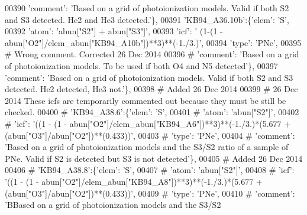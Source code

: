 \begin{DoxyCode}
00390                                       \textcolor{stringliteral}{'comment'}: \textcolor{stringliteral}{'Based on a grid of photoionization models. Valid if both
       S2 and S3 detected. He2 and He3 detected.'}\},
00391                          \textcolor{stringliteral}{'KB94\_A36.10b'}:\{\textcolor{stringliteral}{'elem'}: \textcolor{stringliteral}{'S'},
00392                                      \textcolor{stringliteral}{'atom'}: \textcolor{stringliteral}{'abun["S2"] + abun["S3"]'},
00393                                      \textcolor{stringliteral}{'icf'}: \textcolor{stringliteral}{' (1-(1 - abun["O2"]/elem\_abun["KB94\_A10b"])**3)**(-1./3.)'},
00394                                       \textcolor{stringliteral}{'type'}: \textcolor{stringliteral}{'PNe'},
00395 \textcolor{comment}{# Wrong comment. Corrected 26 Dec 2014}
00396 \textcolor{comment}{#                                      'comment': 'Based on a grid of photoionization models. To be used if
       both O4 and N5 detected'\},}
00397                                       \textcolor{stringliteral}{'comment'}: \textcolor{stringliteral}{'Based on a grid of photoionization models. Valid if both
       S2 and S3 detected. He2 detected, He3 not.'}\},
00398 \textcolor{comment}{# Added 26 Dec 2014}
00399 \textcolor{comment}{# 26 Dec 2014 These icfs are temporarily commented out because they must be still be checked. }
00400 \textcolor{comment}{#                         'KB94\_A38.6':\{'elem': 'S',}
00401 \textcolor{comment}{#                                     'atom': 'abun["S2"]',}
00402 \textcolor{comment}{#                                     'icf': '((1 - (1 -
       abun["O2"]/elem\_abun["KB94\_A6"])**3)**(-1./3.)*(5.677 + (abun["O3"]/abun["O2"])**(0.433))',}
00403 \textcolor{comment}{#                                      'type': 'PNe',}
00404 \textcolor{comment}{#                                      'comment': 'Based on a grid of photoionization models and the S3/S2
       ratio of a sample of PNe. Valid if S2 is detected but S3 is not detected'\},}
00405 \textcolor{comment}{# Added 26 Dec 2014}
00406 \textcolor{comment}{#                         'KB94\_A38.8':\{'elem': 'S',}
00407 \textcolor{comment}{#                                     'atom': 'abun["S2"]',}
00408 \textcolor{comment}{#                                     'icf': '((1 - (1 -
       abun["O2"]/elem\_abun["KB94\_A8"])**3)**(-1./3.)*(5.677 + (abun["O3"]/abun["O2"])**(0.433))',}
00409 \textcolor{comment}{#                                      'type': 'PNe',}
00410 \textcolor{comment}{#                                      'comment': 'BBased on a grid of photoionization models and the S3/S2
}
\end{DoxyCode}
